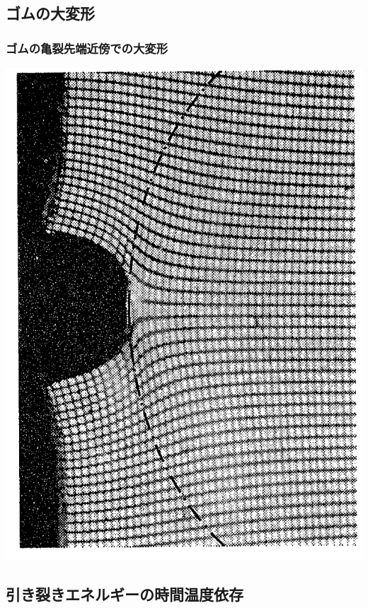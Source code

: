 \documentclass[11pt, dvipdfmx]{beamer}
\begin{document}
\subsection{ゴムの大変形}


\begin{frame}
\frametitle{ゴムの亀裂先端近傍での大変形}



\centering
\includegraphics[width=.5\textwidth]{fig/rubber_crack.png}

\end{frame}


\subsection{引き裂きエネルギーの時間温度依存}
\end{document}
